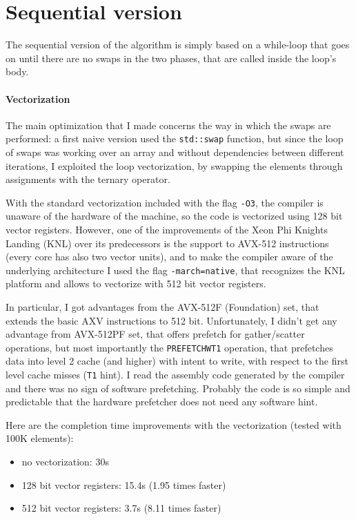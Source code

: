 \section{Sequential version}
The sequential version of the algorithm is simply based on a while-loop that goes on until there are no swaps in the two phases, that are called inside the loop's body.

\paragraph{Vectorization}
The main optimization that I made concerns the way in which the swaps are performed: a first naive version used the \texttt{std::swap} function, but since the loop of swaps was working over an array and without dependencies between different iterations, I exploited the loop vectorization, by swapping the elements through assignments with the ternary operator.

With the standard vectorization included with the flag \texttt{-O3}, the compiler is unaware of the hardware of the machine, so the code is vectorized using 128 bit vector registers. However, one of the improvements of the Xeon Phi Knights Landing (KNL) over its predecessors is the support to AVX-512 instructions (every core has also two vector units), and to make the compiler aware of the underlying architecture I used the flag \texttt{-march=native}, that recognizes the KNL platform and allows to vectorize with 512 bit vector registers.

In particular, I got advantages from the AVX-512F (Foundation) set, that extends the basic AXV instructions to 512 bit. Unfortunately, I didn't get any advantage from AVX-512PF set, that offers prefetch for gather/scatter operations, but most importantly the \texttt{PREFETCHWT1} operation, that prefetches data into level 2 cache (and higher) with intent to write, with respect to the first level cache misses (\texttt{T1} hint). I read the assembly code generated by the compiler and there was no sign of software prefetching. Probably the code is so simple and predictable that the hardware prefetcher does not need any software hint.
\bigbreak

Here are the completion time improvements with the vectorization (tested with 100K elements):
\begin{itemize}
    \item no vectorization: 30s
    \item 128 bit vector registers: 15.4s (1.95 times faster)
    \item 512 bit vector registers: 3.7s (8.11 times faster)
\end{itemize}

